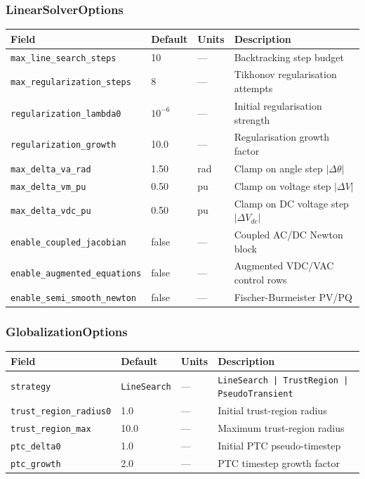 \subsubsection{LinearSolverOptions}
\begin{longtable}{llll}
\hline\hline
\textbf{Field} & \textbf{Default} & \textbf{Units} & \textbf{Description} \\
\hline\endhead\hline\endfoot
\texttt{max\_line\_search\_steps} & 10 & --- & Backtracking step budget \\
\texttt{max\_regularization\_steps} & 8 & --- & Tikhonov regularisation attempts \\
\texttt{regularization\_lambda0} & \(10^{-6}\) & --- & Initial regularisation strength \\
\texttt{regularization\_growth} & 10.0 & --- & Regularisation growth factor \\
\texttt{max\_delta\_va\_rad} & 1.50 & rad & Clamp on angle step $|\Delta\theta|$ \\
\texttt{max\_delta\_vm\_pu} & 0.50 & pu & Clamp on voltage step $|\Delta V|$ \\
\texttt{max\_delta\_vdc\_pu} & 0.50 & pu & Clamp on DC voltage step $|\Delta V_{dc}|$ \\
\texttt{enable\_coupled\_jacobian} & false & --- & Coupled AC/DC Newton block \\
\texttt{enable\_augmented\_equations} & false & --- & Augmented VDC/VAC control rows \\
\texttt{enable\_semi\_smooth\_newton} & false & --- & Fischer-Burmeister PV/PQ \\
\end{longtable}

\subsubsection{GlobalizationOptions}
\begin{center}
\begin{tabular}{llll}
\hline\hline
\textbf{Field} & \textbf{Default} & \textbf{Units} & \textbf{Description} \\
\hline
\texttt{strategy} & \texttt{LineSearch} & --- & \texttt{LineSearch | TrustRegion | PseudoTransient} \\
\texttt{trust\_region\_radius0} & 1.0 & --- & Initial trust-region radius \\
\texttt{trust\_region\_max} & 10.0 & --- & Maximum trust-region radius \\
\texttt{ptc\_delta0} & 1.0 & --- & Initial PTC pseudo-timestep \\
\texttt{ptc\_growth} & 2.0 & --- & PTC timestep growth factor \\
\hline\hline
\end{tabular}
\end{center}

